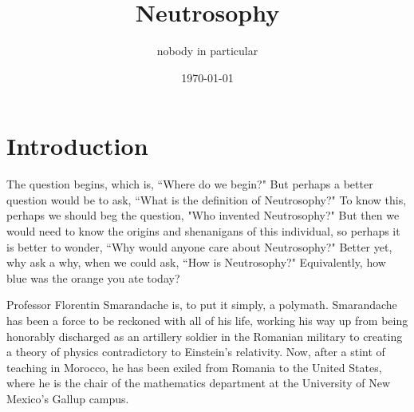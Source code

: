 \documentclass[11pt]{article}
\title{Neutrosophy}
\author{nobody in particular}
\date{\today}
\begin{document}
\maketitle

\section{Introduction}
The question begins, which is, ``Where do we begin?" But perhaps a better question would be to ask, ``What is the definition of Neutrosophy?" To know this, perhaps we should beg the question, "Who invented Neutrosophy?" But then we would need to know the origins and shenanigans of this individual, so perhaps it is better to wonder, ``Why would anyone care about Neutrosophy?" Better yet, why ask a why, when we could ask, ``How is Neutrosophy?" Equivalently, how blue was the orange you ate today?

Professor Florentin Smarandache is, to put it simply, a polymath. Smarandache has been a force to be reckoned with all of his life, working his way up from being honorably discharged as an artillery soldier in the Romanian military to creating a theory of physics contradictory to Einstein's relativity. Now, after a stint of teaching in Morocco, he has been exiled from Romania to the United States, where he is the chair of the mathematics department at the University of New Mexico's Gallup campus. 
\end{document}
